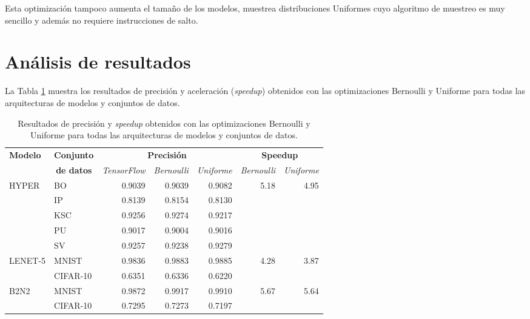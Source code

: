 Esta optimización tampoco aumenta el tamaño de los modelos, muestrea distribuciones Uniformes cuyo algoritmo de muestreo es muy sencillo y además no requiere instrucciones de salto.

\section{Análisis de resultados}

La Tabla \ref{tab:uniform_opt} muestra los resultados de precisión y aceleración (\textit{speedup}) obtenidos con las optimizaciones Bernoulli y Uniforme para todas las arquitecturas de modelos y conjuntos de datos.

\begin{table}[h]
    \centering
    \caption{Resultados de precisión y \textit{speedup} obtenidos con las optimizaciones Bernoulli y Uniforme para todas las arquitecturas de modelos y conjuntos de datos.}
    \label{tab:uniform_opt}
    \begin{tabular}{llrrrrr}
    \hline
     \multirow{2}{*}{\textbf{Modelo}} & \textbf{Conjunto} & \multicolumn{3}{c}{\textbf{Precisión}} & \multicolumn{2}{c}{\textbf{Speedup}} \\
     
     & \multicolumn{1}{c}{\textbf{de datos}} & \multicolumn{1}{l}{\textit{TensorFlow}} & \multicolumn{1}{l}{\textit{Bernoulli}} & \multicolumn{1}{l}{\textit{Uniforme}} & \multicolumn{1}{l}{\textit{Bernoulli}} & \multicolumn{1}{l}{\textit{Uniforme}} \\ \hline
    \multirow{5}{*}{HYPER} 
        & BO & 0.9039 & 0.9039 & 0.9082 & \multirow{5}{*}{5.18} & \multirow{5}{*}{4.95} \\
        & IP & 0.8139 & 0.8154 & 0.8130 \\
        & KSC & 0.9256 & 0.9274 & 0.9217 \\
        & PU & 0.9017 & 0.9004 & 0.9016 \\
        & SV & 0.9257 & 0.9238 & 0.9279 \\ \hline
    \multirow{2}{*}{LENET-5} 
        & MNIST & 0.9836 & 0.9883 & 0.9885 & \multirow{2}{*}{4.28} & \multirow{2}{*}{3.87} \\
        & CIFAR-10 & 0.6351 & 0.6336 & 0.6220 & \\ \hline
    \multirow{2}{*}{B2N2} 
        & MNIST & 0.9872 & 0.9917 & 0.9910 & \multirow{2}{*}{5.67} & \multirow{2}{*}{5.64} \\
        & CIFAR-10 & 0.7295 & 0.7273 & 0.7197 & \\ \hline                  
    \end{tabular}
\end{table}

